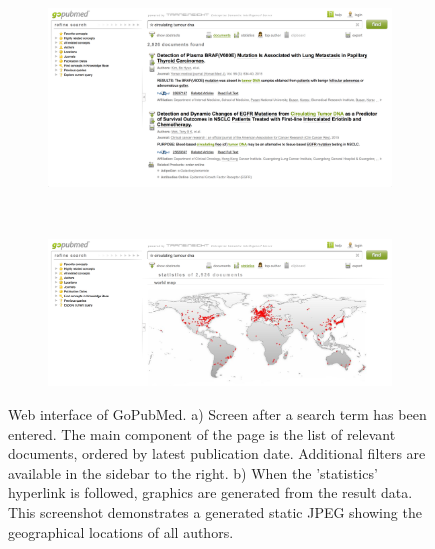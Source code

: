 \documentclass[PROP_AGutteridge_CS.tex]{subfiles}
\begin{document}
\begin{figure}
	\begin{subfigure}{1\textwidth}
		\includegraphics[width=\textwidth]{../lib/images/GPM1}
		\label{fig:GPM1}
	\end{subfigure}\\
	\begin{subfigure}{1\textwidth}
		\includegraphics[width=\textwidth]{../lib/images/GPM4}
		\label{fig:GPM4}
	\end{subfigure} 
\caption{Web interface of GoPubMed. a) Screen after a search term has been entered. The main component of the page is the list of relevant documents, ordered by latest publication date. Additional filters are available in the sidebar to the right. b) When the 'statistics' hyperlink is followed, graphics are generated from the result data. This screenshot demonstrates a generated static JPEG showing the geographical locations of all authors.}
\end{figure}
\end{document}
